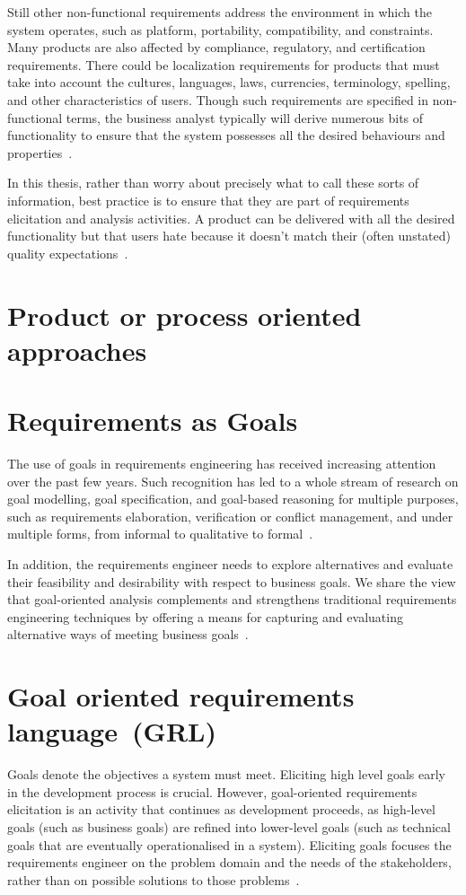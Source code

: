 \documentclass[dissertation,final]{softeng}
\begin{document}
Still other non-functional requirements address the environment in which the system operates, such as platform, portability, compatibility, and constraints. Many products are also affected by compliance, regulatory, and certification requirements. There could be localization requirements for products that must take into account the cultures, languages, laws, currencies, terminology, spelling, and other characteristics of users. Though such requirements are specified in non-functional terms, the business analyst typically will derive numerous bits of functionality to ensure that the system possesses all the desired behaviours and properties~\citep{Wiegers2013}.

In this thesis, rather than worry about precisely what to call these sorts of information, best practice is to ensure that they are part of requirements elicitation and analysis activities. A product can be delivered with all the desired functionality but that users hate because it doesn't match their (often unstated) quality expectations~\citep{Wiegers2013}.



\section{Product or process oriented approaches}

\section{Requirements as Goals}
\label{ch:gore}
The use of goals in requirements engineering has received increasing attention over the past few years. Such recognition has led to a whole stream of research on goal modelling, goal specification, and goal-based reasoning for multiple purposes, such as requirements elaboration, verification or conflict management, and under multiple forms, from informal to qualitative to formal~\citep{Lamsweerde:2001wpba}.

In addition, the requirements engineer needs to explore alternatives and evaluate their feasibility and desirability with respect to business goals. We share the view that goal-oriented analysis complements and strengthens traditional requirements engineering techniques by offering a means for capturing and evaluating alternative ways of meeting business goals~\citep{MylopoulosExpl2001}.

\section{Goal oriented requirements language~(GRL)}
\label{sec:gore}
Goals denote the objectives a system must meet. Eliciting high level goals early in the development process is crucial. However, goal-oriented requirements elicitation is an activity that continues as development proceeds, as high-level goals (such as business goals) are refined into lower-level goals (such as technical goals that are eventually operationalised in a system). Eliciting goals focuses the requirements engineer on the problem domain and the needs of the stakeholders, rather than on possible solutions to those problems~\citep{Nuseibeh:2000ub}.
\end{document}
